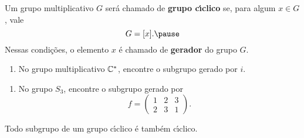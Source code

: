 \documentclass{beamer}
\begin{document}
    \begin{frame}
        \begin{definicao}
            Um grupo multiplicativo $G$ \pause ser\'a chamado de \textbf{grupo c{\'\i}clico} \pause se, para algum $x \in G$, \pause vale \pause
            \[
                G = [x]. \pause
            \]
            Nessas condi\c{c}\~oes, o elemento $x$  \pause \'e chamado de \textbf{gerador} do grupo $G$.
        \end{definicao}
    \end{frame}

    \begin{frame}
        \begin{exemplos}
            \begin{enumerate}[label={\roman*})]
                \item No grupo multiplicativo $\mathbb{C}^*$, \pause encontre o subgrupo gerado por $i$.
                \seti
            \end{enumerate}
        \end{exemplos}
    \end{frame}

    \begin{frame}
        \begin{exemplos}
            \begin{enumerate}[label={\roman*})]
                \conti
                \item No grupo $S_3$, \pause encontre o subgrupo gerado por
                \[
                    f = \begin{pmatrix}
                        1 & 2 & 3\\
                        2 & 3 & 1
                    \end{pmatrix}.
                \]
            \end{enumerate}
        \end{exemplos}
    \end{frame}

    \begin{frame}
        \begin{proposicao}
            Todo subgrupo de um grupo c{\'\i}clico \'e tamb\'em c{\'\i}clico.
        \end{proposicao}
    \end{frame}
\end{document}

